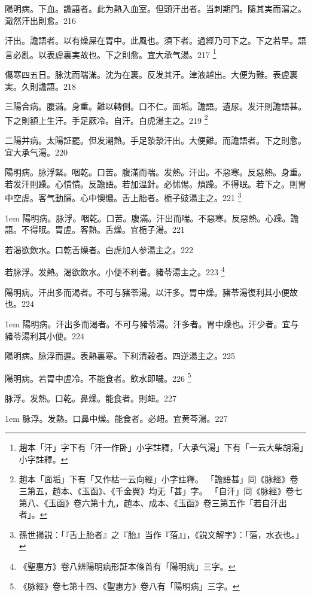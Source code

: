 陽明病。下血。譫語者。此为熱入血室。但頭汗出者。当刺期門。隨其実而瀉之。濈然汗出則愈。216

汗出。譫語者。以有燥屎在胃中。此風也。{\khaai 須下者。}過經乃可下之。下之若早。語言必亂。以表虗裏実故也。下之則愈。宜{\khaai 大}承气湯。217
	\footnote{
		趙本「汗」字下有「汗一作卧」小字註釋，「大承气湯」下有「一云大柴胡湯」小字註釋。
	}

傷寒四五日。脉沈而喘滿。沈为在裏。反发其汗。津液越出。大便为難。表虗裏実。久則譫語。218

三陽合病。腹滿。身重。難以轉側。口不仁。面垢。譫語。遺尿。发汗則譫語{\khaai 甚}。下之則額上生汗。手足厥冷。自汗。白虎湯主之。219
	\footnote{
		趙本「面垢」下有「又作枯一云向經」小字註釋。
		「譫語甚」同《脉經》卷三第五，趙本、《玉函》、《千金翼》均无「甚」字。
		「自汗」同《脉經》卷七第八、《玉函》卷六第十九，趙本、成本、《玉函》卷三第五作「若自汗出者」。
	}

二陽并病。太陽証罷。但发潮熱。手足漐漐汗出。大便難。而譫語者。下之則愈。宜{\khaai 大}承气湯。220

陽明病。脉浮緊。咽乾。口苦。腹滿而喘。发熱。汗出。不惡寒。反惡熱。身重。若发汗則躁。心憒憒。反譫語。若加温針。必怵惕。煩躁。不得眠。若下之。則胃中空虗。客气動膈。心中懊憹。舌上胎者。栀子{\khaai 豉}湯主之。221
	\footnote{
		孫世揚説：「『舌上胎者』之『胎』当作『菭』」，《説文解字》：「菭，水衣也。」
	}

\hangindent 1em
陽明病。脉浮。咽乾。口苦。腹滿。汗出而喘。不惡寒。反惡熱。心躁。譫語。不得眠。胃虗。客熱。舌燥。宜栀子湯。{\shenghui}221

若渴欲飲水。口乾舌燥者。白虎{\khaai 加人参}湯主之。222

若脉浮。发熱。渴欲飲水。小便不利者。豬苓湯主之。223
	\footnote{
		《聖惠方》卷八辨陽明病形証本條首有「陽明病」三字。
	}

陽明病。汗出多而渴者。不可与豬苓湯。以汗多。胃中燥。豬苓湯復利其小便故也。224

\hangindent 1em
陽明病。汗出多而渴者。不可与豬苓湯。汗多者。胃中燥也。汗少者。宜与豬苓湯利其小便。{\shenghui}224

{\khaai 陽明病。}脉浮而遲。表熱裏寒。下利清穀者。四逆湯主之。225

{\khaai 陽明病。}若胃中虗冷。不能食者。飲水即噦。226
	\footnote{
		《脉經》卷七第十四、《聖惠方》卷八有「陽明病」三字。
	}

脉浮。发熱。口乾。鼻燥。能食者。則衄。227

\hangindent 1em
脉浮。发熱。口鼻中燥。能食者。必衄。宜黄芩湯。{\shenghui}227

